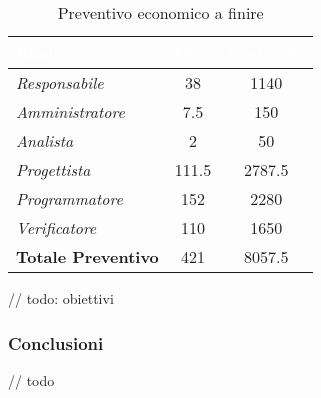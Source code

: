 \begin{table}[H]
    \renewcommand\arraystretch{1.5}
    \centering
    \begin{tabular}{|l|c|c|}
    \hline
    \rowcolor[HTML]{036400}
    \textcolor{white}{\textbf{Ruolo}} & \multicolumn{1}{l|}{\textcolor{white}{\textbf{Ore}}} & \multicolumn{1}{l|}{\textcolor{white}{\textbf{Costo (€)}}} \\ \hline
    \rowcolor[HTML]{EFEFEF}\textit{Responsabile}      & 38              & 1140                 \\ \hline
    \rowcolor[HTML]{C0C0C0}\textit{Amministratore}    & 7.5             & 150                 \\ \hline
    \rowcolor[HTML]{EFEFEF}\textit{Analista}          & 2               & 50                 \\ \hline
    \rowcolor[HTML]{C0C0C0}\textit{Progettista}       & 111.5           & 2787.5                 \\ \hline
    \rowcolor[HTML]{EFEFEF}\textit{Programmatore}     & 152             & 2280                 \\ \hline
    \rowcolor[HTML]{C0C0C0}\textit{Verificatore}      & 110             & 1650                 \\ \hline
    \rowcolor[HTML]{EFEFEF}\textbf{Totale Preventivo} & 421             & 8057.5            \\ \hline
    \end{tabular}
    \caption{Preventivo economico a finire}
\end{table}



// todo: obiettivi

\subsubsection{Conclusioni}
// todo